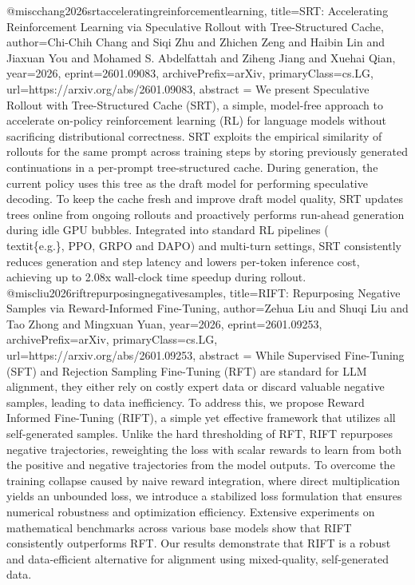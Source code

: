 {}@misc{chang2026srtacceleratingreinforcementlearning,
      title={SRT: Accelerating Reinforcement Learning via Speculative Rollout with Tree-Structured Cache}, 
      author={Chi-Chih Chang and Siqi Zhu and Zhichen Zeng and Haibin Lin and Jiaxuan You and Mohamed S. Abdelfattah and Ziheng Jiang and Xuehai Qian},
      year={2026},
      eprint={2601.09083},
      archivePrefix={arXiv},
      primaryClass={cs.LG},
      url={https://arxiv.org/abs/2601.09083},
      abstract = {We present Speculative Rollout with Tree-Structured Cache (SRT), a simple, model-free approach to accelerate on-policy reinforcement learning (RL) for language models without sacrificing distributional correctness. SRT exploits the empirical similarity of rollouts for the same prompt across training steps by storing previously generated continuations in a per-prompt tree-structured cache. During generation, the current policy uses this tree as the draft model for performing speculative decoding. To keep the cache fresh and improve draft model quality, SRT updates trees online from ongoing rollouts and proactively performs run-ahead generation during idle GPU bubbles. Integrated into standard RL pipelines (\\textit\{e.g.\}, PPO, GRPO and DAPO) and multi-turn settings, SRT consistently reduces generation and step latency and lowers per-token inference cost, achieving up to 2.08x wall-clock time speedup during rollout.}
}@misc{liu2026riftrepurposingnegativesamples,
      title={RIFT: Repurposing Negative Samples via Reward-Informed Fine-Tuning}, 
      author={Zehua Liu and Shuqi Liu and Tao Zhong and Mingxuan Yuan},
      year={2026},
      eprint={2601.09253},
      archivePrefix={arXiv},
      primaryClass={cs.LG},
      url={https://arxiv.org/abs/2601.09253},
      abstract = {While Supervised Fine-Tuning (SFT) and Rejection Sampling Fine-Tuning (RFT) are standard for LLM alignment, they either rely on costly expert data or discard valuable negative samples, leading to data inefficiency. To address this, we propose Reward Informed Fine-Tuning (RIFT), a simple yet effective framework that utilizes all self-generated samples. Unlike the hard thresholding of RFT, RIFT repurposes negative trajectories, reweighting the loss with scalar rewards to learn from both the positive and negative trajectories from the model outputs. To overcome the training collapse caused by naive reward integration, where direct multiplication yields an unbounded loss, we introduce a stabilized loss formulation that ensures numerical robustness and optimization efficiency. Extensive experiments on mathematical benchmarks across various base models show that RIFT consistently outperforms RFT. Our results demonstrate that RIFT is a robust and data-efficient alternative for alignment using mixed-quality, self-generated data.}
}
